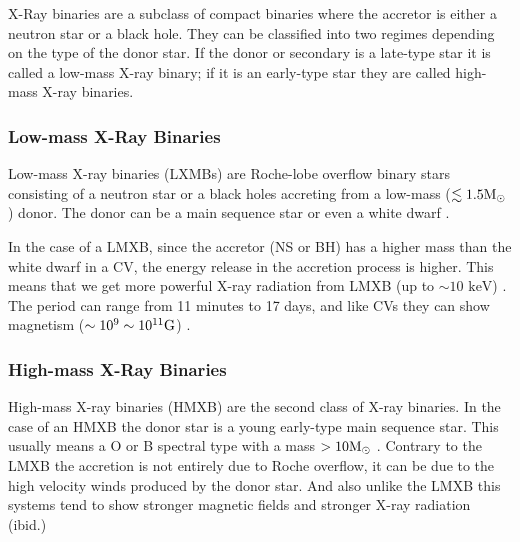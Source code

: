 X-Ray binaries are a subclass of compact binaries where the accretor is either a neutron star or a black hole. They can be classified into two regimes depending on the type of the donor star. If the donor or secondary is a late-type star it is called a low-mass X-ray binary; if it is an early-type star they are called high-mass X-ray binaries.

\subsubsection{Low-mass X-Ray Binaries}

Low-mass X-ray binaries (LXMBs) are Roche-lobe overflow binary stars consisting of a neutron star or a black holes accreting from a low-mass ($\lesssim 1.5 \text M_\odot$) donor. The donor can be a main sequence star or even a white dwarf \citep{tauris_formation_2006}.

In the case of a LMXB, since the accretor (NS or BH) has a higher mass than the white dwarf in a CV, the energy release in the accretion process is higher. This means that we get more powerful X-ray radiation from LMXB (up to $\sim 10 \text{ keV}$) \citep{tauris_formation_2006}. The period can range from 11 minutes to 17 days, and like CVs they can show magnetism ($\sim 10^9 \sim 10^{11} \text G$) \citep{tauris_formation_2006}. 


\subsubsection{High-mass X-Ray Binaries}

High-mass X-ray binaries (HMXB) are the second class of X-ray binaries. In the case of an HMXB the donor star is a young early-type main sequence star. This usually means a O or B spectral type with a mass $> 10 \text M _\odot$ \citep[e.g.][]{tauris_formation_2006}. Contrary to the LMXB the accretion is not entirely due to Roche overflow, it can be due to the high velocity winds produced by the donor star. And also unlike the LMXB this systems tend to show stronger magnetic fields and stronger X-ray radiation (ibid.)

